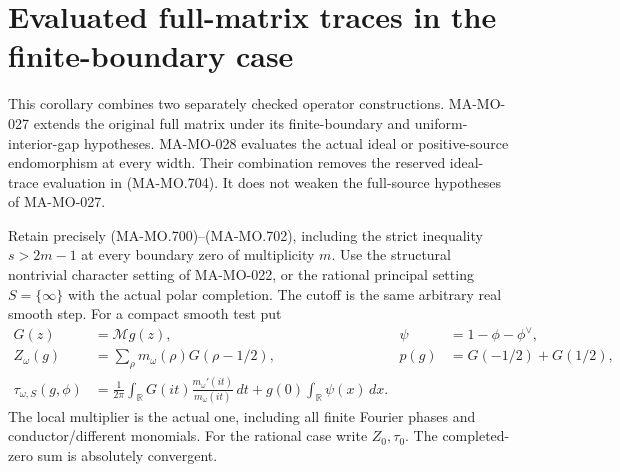 \section{Evaluated full-matrix traces in the finite-boundary case}
\label{sec:finite-boundary-trace-corollary}

This corollary combines two separately checked operator
constructions. MA-MO-027 extends the original full matrix
under its finite-boundary and uniform-interior-gap hypotheses.
MA-MO-028 evaluates the actual ideal or positive-source
endomorphism at every width. Their combination removes
the reserved ideal-trace evaluation in (MA-MO.704).
It does not weaken the full-source hypotheses of MA-MO-027.

Retain precisely (MA-MO.700)--(MA-MO.702), including
the strict inequality \(s>2m-1\) at every boundary
zero of multiplicity \(m\). Use the structural nontrivial
character setting of MA-MO-022, or the rational principal
setting \(S=\{\infty\}\) with the actual polar completion.
The cutoff is the same arbitrary real smooth step.
For a compact smooth test put
\[
 \begin{aligned}
 G(z)&=\mathcal Mg(z),&
 \psi&=1-\phi-\phi^\vee,\\
 Z_\omega(g)&=\sum_\rho m_\omega(\rho)G(\rho-1/2),&
 p(g)&=G(-1/2)+G(1/2),\\
 \tau_{\omega,S}(g,\phi)
   &=\frac1{2\pi}\int_{\mathbb R}
             G(it)\frac{m_\omega'(it)}{m_\omega(it)}\,dt
                         +g(0)\int_{\mathbb R}\psi(x)\,dx .
 \end{aligned}
 \tag{MA-MO.850}
\]
The local multiplier is the actual one, including all
finite Fourier phases and conductor/different monomials.
For the rational case write \(Z_0,\tau_0\).
The completed-zero sum is absolutely convergent.

